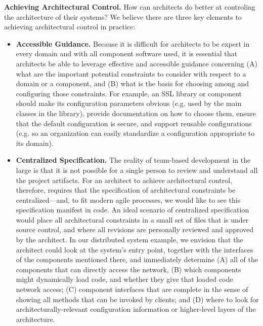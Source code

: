\documentclass[runningheads]{llncs}
\newcommand{\minisec}[1]{\vspace{2ex}\noindent\textbf{#1}}
\begin{document}
\begin{sloppypar}
\begin{itemize}
\end{itemize}


\minisec{Achieving Architectural Control.} How can architects do better at controling the architecture of their systems?  We believe there are three key elements to achieving architectural control in practice:

\begin{itemize}

\item \textbf{Accessible Guidance.}  Because it is difficult for architects to be expert in every domain and with all component software used, it is essential that architects be able to leverage effective and accessible guidance concerning (A) what are the important potential constraints to consider with respect to a domain or a component, and (B) what is the basis for choosing among and configuring those constraints.  For example, an SSL library or component should make its configuration parameters obvious (e.g. used by the main classes in the library), provide documentation on how to choose them, ensure that the default configuration is secure, and support reusable configurations (e.g. so an organization can easily standardize a configuration appropriate to its domain).

\item \textbf{Centralized Specification.}  The reality of team-based development in the large is that it is not possible for a single person to review and understand all the project artifacts.  For an architect to achieve architectural control, therefore, requires that the specification of architectural constraints be centralized---and, to fit modern agile processes, we would like to see this specification manifest in code.  An ideal scenario of centralized specification would place all architectural constraints in a small set of files that is under source control, and where all revisions are personally reviewed and approved by the architect.  In our distributed system example, we envision that the architect could look at the system's entry point, together with the interfaces of the components mentioned there, and immediately determine (A) all of the components that can directly access the network, (B) which components might dynamically load code, and whether they give that loaded code network access; (C) component interfaces that are complete in the sense of showing all methods that can be invoked by clients; and (D) where to look for architecturally-relevant configuration information or higher-level layers of the architecture.


\end{itemize}
\end{sloppypar}
\end{document}
